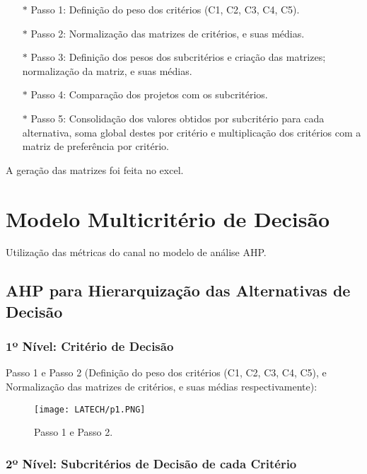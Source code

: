 \documentclass[onecolumn,11pt]{asme2ej}
\begin{document}
\begin{itemize}
    \item[$*$] Passo 1: Definição do peso dos critérios (C1, C2, C3, C4, C5).
    
    \item[$*$] Passo 2: Normalização das matrizes de critérios, e suas médias.
    
    \item[$*$] Passo 3: Definição dos pesos dos subcritérios e criação das matrizes; normalização da matriz, e suas médias.
    
    \item[$*$] Passo 4: Comparação dos projetos com os subcritérios.
    
    \item[$*$] Passo 5: Consolidação dos valores obtidos por subcritério para cada alternativa, soma global destes por critério e multiplicação dos critérios com a matriz de preferência por critério.
    
\end{itemize}

A geração das matrizes foi feita no excel.

\section{Modelo Multicritério de Decisão}

Utilização das métricas do canal no modelo de análise AHP.

\subsection{AHP para Hierarquização das Alternativas de Decisão}

\subsubsection{1º Nível: Critério de Decisão}

Passo 1 e Passo 2 (Definição do peso dos critérios (C1, C2, C3, C4, C5), e Normalização das matrizes de critérios, e suas médias respectivamente):

\FloatBarrier
\begin{figure}[h]
    \centering
    \texttt{[image: LATECH/p1.PNG]}
     \caption{Passo 1 e Passo 2.}
    \label{fig:p_1}
\end{figure}
\FloatBarrier

\subsubsection{2º Nível: Subcritérios de Decisão de cada Critério}
\end{document}
